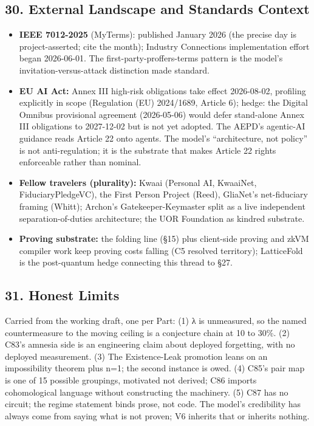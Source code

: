 \documentclass[
]{article}
\providecommand{\tightlist}{%
  \setlength{\itemsep}{0pt}\setlength{\parskip}{0pt}}
\begin{document}
\subsection{30. External Landscape and Standards
Context}\label{external-landscape-and-standards-context}

\begin{itemize}
\tightlist
\item
  \textbf{IEEE 7012-2025} (MyTerms): published January 2026 (the precise
  day is project-asserted; cite the month); Industry Connections
  implementation effort began 2026-06-01. The first-party-proffers-terms
  pattern is the model's invitation-versus-attack distinction made
  standard.
\item
  \textbf{EU AI Act:} Annex III high-risk obligations take effect
  2026-08-02, profiling explicitly in scope (Regulation (EU) 2024/1689,
  Article 6); hedge: the Digital Omnibus provisional agreement
  (2026-05-06) would defer stand-alone Annex III obligations to
  2027-12-02 but is not yet adopted. The AEPD's agentic-AI guidance
  reads Article 22 onto agents. The model's ``architecture, not policy''
  is not anti-regulation; it is the substrate that makes Article 22
  rights enforceable rather than nominal.
\item
  \textbf{Fellow travelers (plurality):} Kwaai (Personal AI, KwaaiNet,
  FiduciaryPledgeVC), the First Person Project (Reed), GliaNet's
  net-fiduciary framing (Whitt); Archon's Gatekeeper-Keymaster split as
  a live independent separation-of-duties architecture; the UOR
  Foundation as kindred substrate.
\item
  \textbf{Proving substrate:} the folding line (§15) plus client-side
  proving and zkVM compiler work keep proving costs falling (C5 resolved
  territory); LatticeFold is the post-quantum hedge connecting this
  thread to §27.
\end{itemize}

\subsection{31. Honest Limits}\label{honest-limits}

Carried from the working draft, one per Part: (1) λ is unmeasured, so
the named countermeasure to the moving ceiling is a conjecture chain at
10 to 30\%. (2) C83's amnesia side is an engineering claim about
deployed forgetting, with no deployed measurement. (3) The
Existence-Leak promotion leans on an impossibility theorem plus n=1; the
second instance is owed. (4) C85's pair map is one of 15 possible
groupings, motivated not derived; C86 imports cohomological language
without constructing the machinery. (5) C87 has no circuit; the regime
statement binds prose, not code. The model's credibility has always come
from saying what is not proven; V6 inherits that or inherits nothing.
\end{document}
